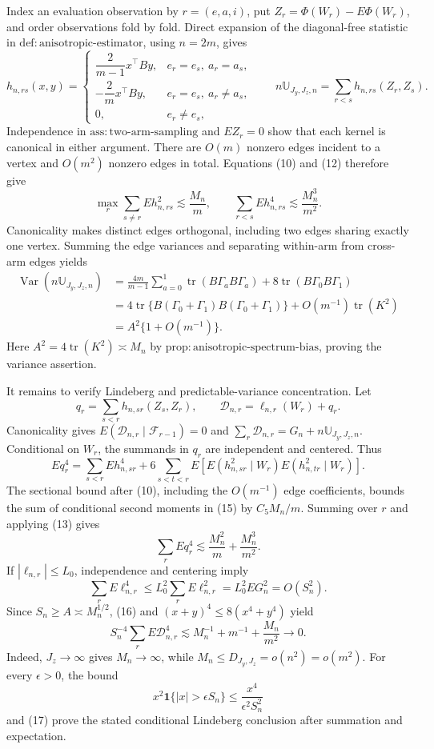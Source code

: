 Index an evaluation observation by \(r=(e,a,i)\), put \(Z_r=\Phi(W_r)-E\Phi(W_r)\), and order observations fold by fold. Direct expansion of the diagonal-free statistic in \(\mathrm{def{:}anisotropic\text{-}estimator}\), using \(n=2m\), gives
\[
h_{n,rs}(x,y)=
\begin{cases}
\dfrac{2}{m-1}x^{\top}By,&e_r=e_s,\ a_r=a_s,\\[4pt]
-\dfrac{2}{m}x^{\top}By,&e_r=e_s,\ a_r\ne a_s,\\[4pt]
0,&e_r\ne e_s,
\end{cases}
\qquad
n\mathbb U_{J_y,J_z,n}=\sum_{r<s}h_{n,rs}(Z_r,Z_s). \tag{12}
\]
Independence in \(\mathrm{ass{:}two\text{-}arm\text{-}sampling}\) and \(EZ_r=0\) show that each kernel is canonical in either argument. There are \(O(m)\) nonzero edges incident to a vertex and \(O(m^2)\) nonzero edges in total. Equations (10) and (12) therefore give
\[
\max_r\sum_{s\ne r}Eh_{n,rs}^2\lesssim\frac{M_n}{m},
\qquad
\sum_{r<s}Eh_{n,rs}^4\lesssim\frac{M_n^3}{m^2}. \tag{13}
\]
Canonicality makes distinct edges orthogonal, including two edges sharing exactly one vertex. Summing the edge variances and separating within-arm from cross-arm edges yields
\[
\begin{split}
\operatorname{Var}(n\mathbb U_{J_y,J_z,n})
&=\frac{4m}{m-1}\sum_{a=0}^1\operatorname{tr}(B\Gamma_aB\Gamma_a)
+8\operatorname{tr}(B\Gamma_0B\Gamma_1)\\
&=4\operatorname{tr}\{B(\Gamma_0+\Gamma_1)B(\Gamma_0+\Gamma_1)\}
+O(m^{-1})\operatorname{tr}(K^2)\\
&=A^2\{1+O(m^{-1})\}.
\end{split} \tag{14}
\]
Here \(A^2=4\operatorname{tr}(K^2)\asymp M_n\) by \(\mathrm{prop{:}anisotropic\text{-}spectrum\text{-}bias}\), proving the variance assertion.

It remains to verify Lindeberg and predictable-variance concentration. Let
\[
q_r=\sum_{s<r}h_{n,sr}(Z_s,Z_r),
\qquad
\mathcal D_{n,r}=\ell_{n,r}(W_r)+q_r.
\]
Canonicality gives \(E(\mathcal D_{n,r}\mid\mathcal F_{r-1})=0\) and \(\sum_r\mathcal D_{n,r}=G_n+n\mathbb U_{J_y,J_z,n}\). Conditional on \(W_r\), the summands in \(q_r\) are independent and centered. Thus
\[
Eq_r^4
=\sum_{s<r}Eh_{n,sr}^4
+6\sum_{s<t<r}E\!\left[E(h_{n,sr}^2\mid W_r)E(h_{n,tr}^2\mid W_r)\right]. \tag{15}
\]
The sectional bound after (10), including the \(O(m^{-1})\) edge coefficients, bounds the sum of conditional second moments in (15) by \(C_5M_n/m\). Summing over \(r\) and applying (13) gives
\[
\sum_rEq_r^4\lesssim\frac{M_n^2}{m}+\frac{M_n^3}{m^2}. \tag{16}
\]
If \(|\ell_{n,r}|\le L_0\), independence and centering imply
\[
\sum_rE\ell_{n,r}^4\le L_0^2\sum_rE\ell_{n,r}^2
=L_0^2EG_n^2=O(S_n^2).
\]
Since \(S_n\ge A\asymp M_n^{1/2}\), (16) and \((x+y)^4\le8(x^4+y^4)\) yield
\[
S_n^{-4}\sum_rE\mathcal D_{n,r}^4
\lesssim M_n^{-1}+m^{-1}+\frac{M_n}{m^2}\longrightarrow0. \tag{17}
\]
Indeed, \(J_z\to\infty\) gives \(M_n\to\infty\), while \(M_n\le D_{J_y,J_z}=o(n^2)=o(m^2)\). For every \(\epsilon>0\), the bound
\[
x^2\mathbf 1\{|x|>\epsilon S_n\}\le\frac{x^4}{\epsilon^2S_n^2}
\]
and (17) prove the stated conditional Lindeberg conclusion after summation and expectation.

